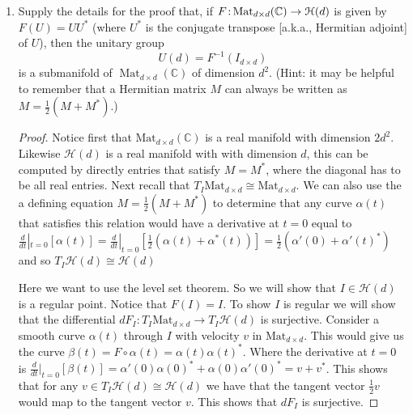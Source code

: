 \documentclass[11pt]{article}
\theoremstyle{definition}
\theoremstyle{definition}
\newcommand{\C}{{\mathbb C}}
\newcommand{\from}{\co\!\!}
\def\co{\colon}
\begin{document}
\begin{enumerate}
\begin{enumerate}
\begin{proof}
			The converse is not true. Consider two manifolds $M$,$N$ such that $M$ is orientable and $N$ is not, 
			and consider the inclusion map of $M\rightarrow M\times N$, which satisfies the assumptions but $M\times N$ is not orientable.
        \end{proof} 
    \end{enumerate}
	
	
	
	\item Supply the details for the proof that, if $F \from \operatorname{Mat}_{d \times d}(\C) \to \EuScript{H}(d)$ is given by $F(U) = UU^*$ (where $U^*$ is the conjugate transpose [a.k.a., Hermitian adjoint] of $U$), then the unitary group
	\[
		U(d) = F^{-1}(I_{d \times d})
	\]
	is a submanifold of $\operatorname{Mat}_{d \times d}(\C)$ of dimension $d^2$. (Hint: it may be helpful to remember that a Hermitian matrix $M$ can always be written as $M = \frac{1}{2}(M + M^*)$.)
	
    \begin{proof}
        Notice first that $\text{Mat}_{d\times d}(\C)$ is a real manifold with dimension $2d^2$. Likewise $\mathcal H(d)$ is a real manifold with with dimension $d$, 
		this can be computed by directly entries that satisfy $M=M^*$, where the diagonal has to be all real entries. Next recall that 
		$T_I\text{Mat}_{d\times d} \cong \text{Mat}_{d\times d}$. We can also use the a defining equation $M=\frac{1}{2}(M+M^*)$ to determine that any curve 
		$\alpha(t)$ that satisfies this relation would have a derivative at $t=0$ equal to 
		$\frac{d}{dt}|_{t=0}\left[\alpha(t)\right]=\frac{d}{dt}|_{t=0}\left[\frac{1}{2}(\alpha(t)+\alpha^*(t))\right]=\frac{1}{2}(\alpha'(0)+\alpha'(t)^*)$
		and so $T_I\mathcal H(d)\cong \mathcal H(d)$

		Here we want to use the level set theorem. So we will show that $I\in\mathcal H(d)$ is a regular point. Notice that $F(I)=I$. To show $I$ is regular
		we will show that the differential $dF_I:T_I \text{Mat}_{d\times d}\rightarrow T_I\mathcal H(d)$ is surjective.
		Consider a smooth curve $\alpha(t)$ through $I$ with velocity $v$ in $\text{Mat}_{d\times d}$. This would give us the curve $\beta(t)=F\circ\alpha(t)=\alpha(t)\alpha(t)^*$.
		Where the derivative at $t=0$ is $\frac{d}{dt}|_{t=0}\left[\beta(t)\right]=\alpha'(0)\alpha(0)^*+\alpha(0)\alpha'(0)^*=v+v^*$.
		This shows that for any $v\in T_I\mathcal H(d)\cong \mathcal H(d)$ we have that the tangent vector $\frac{1}{2}v$ would map to the tangent vector $v$.
		This shows that $dF_I$ is surjective.


\end{proof}
\end{enumerate}
\end{document}
